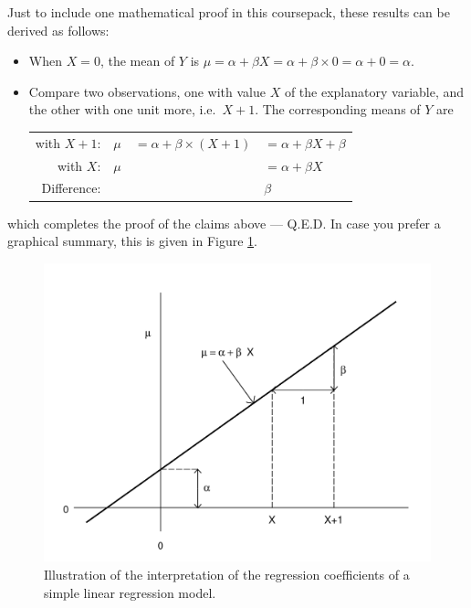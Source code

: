 \documentclass[11pt,a4paper,openany]{book}
\begin{document}
Just to include one mathematical proof in this coursepack, these results
can be derived as follows:

\begin{itemize}
\item
  When \(X=0\), the mean of \(Y\) is
  \(\mu=\alpha+\beta X=\alpha+\beta\times 0 =\alpha+0=\alpha\).
\item
  Compare two observations, one with value \(X\) of the explanatory
  variable, and the other with one unit more, i.e.~\(X+1\). The
  corresponding means of \(Y\) are

  \begin{longtable}[]{@{}rlll@{}}
  \toprule
  with \(X+1\): & \(\mu\) & \(=\alpha+\beta\times (X+1)\) &
  \(=\alpha+\beta X +\beta\)\tabularnewline
  with \(X\): & \(\mu\) & & \(=\alpha+\beta X\)\tabularnewline
  Difference: & & & \(\beta\)\tabularnewline
  \bottomrule
  \end{longtable}
\end{itemize}

which completes the proof of the claims above --- Q.E.D. In case you
prefer a graphical summary, this is given in Figure
\ref{fig:f-linmod-params}.

\begin{figure}[htbp]
\centering
\includegraphics[width=12.50000cm]{lmparams.pdf}
\caption{\label{fig:f-linmod-params} Illustration of the interpretation of
the regression coefficients of a simple linear regression model.}
\end{figure}
\end{document}
